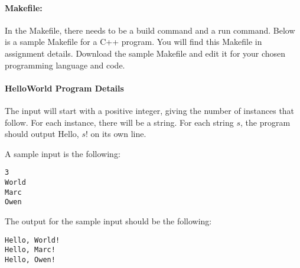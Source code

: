 \documentclass[solutionorbox,answers]{exam}
\begin{document}
\begin{questions}
\paragraph{Makefile:} In the Makefile, there needs to be a build command and a run command. Below is a sample Makefile for a C++ program. You will find this Makefile in assignment details. Download the sample Makefile and edit it for your chosen programming language and code.



\paragraph{HelloWorld Program Details}

The input will start with a positive integer, giving the number of instances that follow. For each instance, there will be a string. For each string $s$, the program should output Hello, $s$! on its own line.

A sample input is the following:
\begin{verbatim}
3
World
Marc
Owen
\end{verbatim}

The output for the sample input should be the following:
\begin{verbatim}
Hello, World!
Hello, Marc!
Hello, Owen!
\end{verbatim}

\end{questions}
\end{document}
